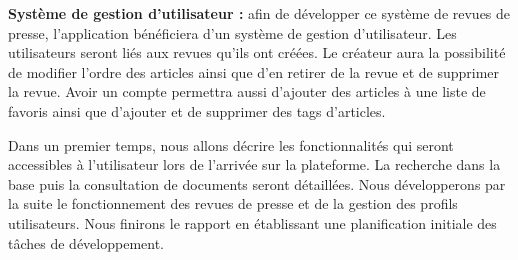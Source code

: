 		\textbf{Système de gestion d'utilisateur :} afin de développer ce système de revues de presse, l’application bénéficiera d’un système de gestion d’utilisateur. Les utilisateurs seront liés aux revues qu’ils ont créées. Le créateur aura la possibilité de modifier l'ordre des articles ainsi que d'en retirer de la revue et de supprimer la revue. Avoir un compte permettra aussi d'ajouter des articles à une liste de favoris ainsi que d'ajouter et de supprimer des tags d'articles.

    Dans un premier temps, nous allons décrire les fonctionnalités qui seront accessibles à l'utilisateur lors de l'arrivée sur la plateforme. La recherche dans la base puis la consultation de documents seront détaillées. Nous développerons par la suite le fonctionnement des revues de presse et de la gestion des profils utilisateurs. Nous finirons le rapport en établissant une planification initiale des tâches de développement.
